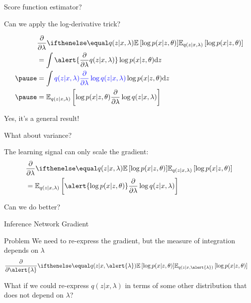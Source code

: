 \documentclass[14pt]{beamer}
\begin{document}
\begin{frame}{Score function estimator?}

	Can we apply the log-derivative trick? 
	\vspace{-10pt}
	
	\begin{equation*}
	\begin{aligned}
	&\pdv{\lambda}\E[q(z|x,\lambda)]{\log p(x|z,\theta)} \\
	&= \int \alert{\pdv{\lambda} q(z|x,\lambda)}\log p(x|z,\theta) \dd z \\ \pause
	&= \int \textcolor{blue}{q(z|x,\lambda) \pdv{\lambda} \log q(z|x,\lambda)}\log p(x|z,\theta) \dd z \\ \pause
	&= \mathbb E_{q(z|x,\lambda)}\left[ \log p(x|z,\theta) \pdv{\lambda} \log q(z|x,\lambda)  \right]
	\end{aligned}
	\end{equation*}
	
	Yes, it's a general result!

\end{frame}

\begin{frame}{What about variance?}

	The learning signal can only scale the gradient:
	\begin{equation*}
	\begin{aligned}
	&\pdv{\lambda}\E[q(z|x,\lambda)]{\log p(x|z,\theta)} \\
	&= \mathbb E_{q(z|x,\lambda)}\left[ \alert{\log p(x|z,\theta)} \pdv{\lambda} \log q(z|x,\lambda)  \right]
	\end{aligned}
	\end{equation*}
	
	\pause
	
	Can we do better? 
	
\end{frame}
\begin{frame}{Inference Network Gradient}
\begin{block}{Problem}
We need to re-express the gradient, but the measure of integration depends on $\lambda$
	\begin{equation*}
	\begin{aligned}
	&\pdv{\alert{\lambda}}\E[q(z|x,\alert{\lambda})]{\log p(x|z,\theta)}
	\end{aligned}
	\end{equation*}
	
	\pause
	
	What if we could re-express $q(z|x, \lambda)$ in terms of some other distribution that does not depend on $\lambda$?

\end{block}
\end{frame}
\end{document}
